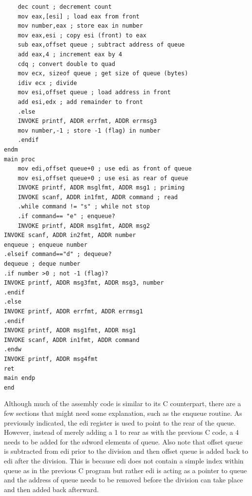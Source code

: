 \documentclass[10pt]{article}
\begin{document}
\begin{verbatim}
    dec count ; decrement count
    mov eax,[esi] ; load eax from front
    mov number,eax ; store eax in number
    mov eax,esi ; copy esi (front) to eax
    sub eax,offset queue ; subtract address of queue
    add eax,4 ; increment eax by 4
    cdq ; convert double to quad
    mov ecx, sizeof queue ; get size of queue (bytes)
    idiv ecx ; divide
    mov esi,offset queue ; load address in front
    add esi,edx ; add remainder to front
    .else
    INVOKE printf, ADDR errfmt, ADDR errmsg3
    mov number,-1 ; store -1 (flag) in number
    .endif
endm
main proc
    mov edi,offset queue+0 ; use edi as front of queue
    mov esi,offset queue+0 ; use esi as rear of queue
    INVOKE printf, ADDR msglfmt, ADDR msg1 ; priming
    INVOKE scanf, ADDR in1fmt, ADDR command ; read
    .while command != "s" ; while not stop
    .if command== "e" ; enqueue?
    INVOKE printf, ADDR msg1fmt, ADDR msg2
INVOKE scanf, ADDR in2fmt, ADDR number
enqueue ; enqueue number
.elseif command=="d" ; dequeue?
dequeue ; deque number
.if number >0 ; not -1 (flag)?
INVOKE printf, ADDR msg3fmt, ADDR msg3, number
.endif
.else
INVOKE printf, ADDR errfmt, ADDR errmsg1
.endif
INVOKE printf, ADDR msg1fmt, ADDR msg1
INVOKE scanf, ADDR in1fmt, ADDR command
.endw
INVOKE printf, ADDR msg4fmt
ret
main endp
end
\end{verbatim}

Although much of the assembly code is similar to its C counterpart, there are a few sections that might need some explanation, such as the enqueue routine. As previously indicated, the edi register is used to point to the rear of the queue. However, instead of merely adding a 1 to rear as with the previous C code, a 4\\
needs to be added for the sdword elements of queue. Also note that offset queue is subtracted from edi prior to the division and then offset queue is added back to edi after the division. This is because edi does not contain a simple index within queue as in the previous C program but rather edi is acting as a pointer to queue and the address of queue needs to be removed before the division can take place and then added back afterward.
\end{document}
